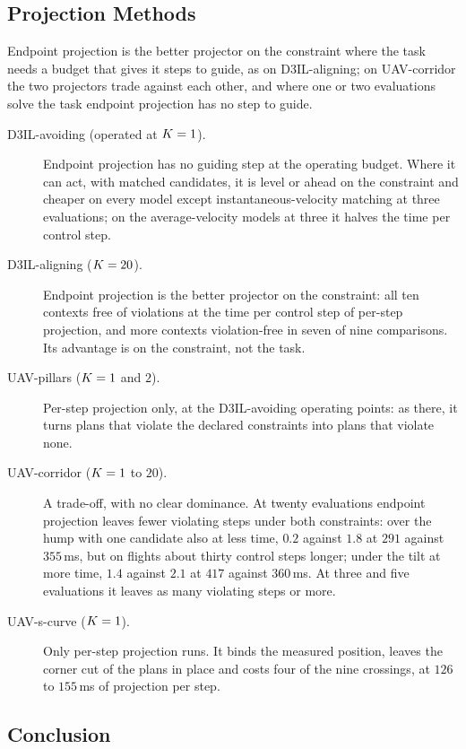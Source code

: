 \subsection{Projection Methods}\label{sec:res:constraints}

Endpoint projection is the better projector on the constraint where the task needs a budget that gives it
steps to guide, as on D3IL-aligning; on UAV-corridor the two projectors trade against each other, and where one
or two evaluations solve the task endpoint projection has no step to guide.

\begin{description}
  \item[D3IL-avoiding (operated at $K=1$).] Endpoint projection has no guiding step at the operating
    budget. Where it can act, with matched candidates, it is level or ahead on the constraint and cheaper on
    every model except instantaneous-velocity matching at three evaluations; on the average-velocity models
    at three it halves the time per control step.
  \item[D3IL-aligning ($K=20$).] Endpoint projection is the better projector on the constraint: all ten
    contexts free of violations at the time per control step of per-step projection, and more contexts
    violation-free in seven of nine comparisons. Its advantage is on the constraint, not the task.
  \item[UAV-pillars ($K=1$ and $2$).] Per-step projection only, at the D3IL-avoiding operating points: as
    there, it turns plans that violate the declared constraints into plans that violate none.
  \item[UAV-corridor ($K=1$ to $20$).] A trade-off, with no clear dominance. At twenty evaluations endpoint
    projection leaves fewer violating steps under both constraints: over the hump with one candidate also at
    less time, $0.2$ against $1.8$ at $291$ against $355$\,ms, but on flights about thirty control steps
    longer; under the tilt at more time, $1.4$ against $2.1$ at $417$ against $360$\,ms. At three and five
    evaluations it leaves as many violating steps or more.
  \item[UAV-s-curve ($K=1$).] Only per-step projection runs. It binds the measured position, leaves the
    corner cut of the plans in place and costs four of the nine crossings, at $126$ to $155$\,ms of
    projection per step.
\end{description}

\subsection{Conclusion}\label{sec:res:summary:conclusion}

